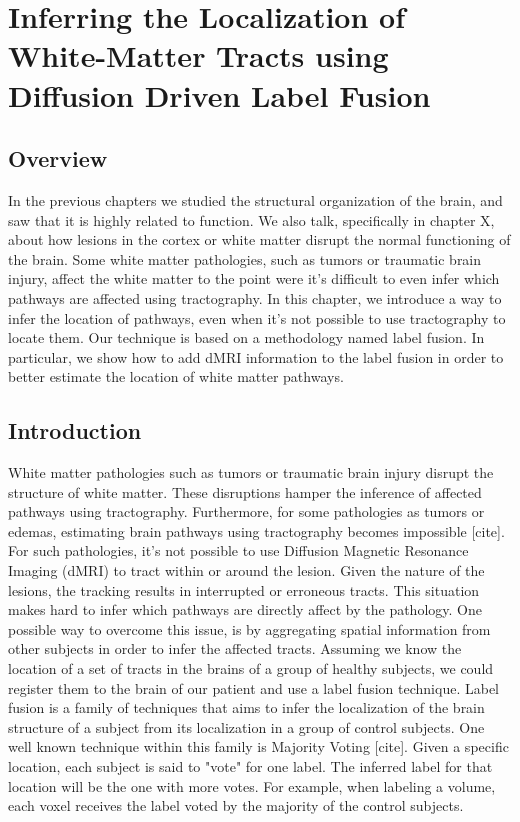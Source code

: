 \chapter{Inferring the Localization of White-Matter Tracts using Diffusion Driven Label Fusion}

\section{Overview}
In the previous chapters we studied the structural organization of the brain,
and saw that it is highly related to function. We also talk, specifically in
chapter X, about how lesions in the cortex or white matter disrupt the normal
functioning of the brain. Some white matter pathologies, such as tumors
or traumatic brain injury, affect the white matter to the point were it's
difficult to even infer which pathways are affected using tractography.
In this chapter, we introduce a way to infer the location of pathways, even
when it's not possible to use tractography to locate them. Our technique is
based on a methodology named label fusion. In particular, we show how to add
dMRI information to the label fusion in order to better estimate the location
of white matter pathways.

\section{Introduction}

White matter pathologies such as tumors or traumatic brain injury disrupt the
structure of white matter. These disruptions hamper the inference of affected
pathways using tractography. Furthermore, for some pathologies as tumors or
edemas, estimating brain pathways using tractography becomes impossible [cite].
For such pathologies, it's not possible to use Diffusion Magnetic Resonance
Imaging (dMRI) to tract within or around the lesion. Given the nature of the
lesions, the tracking results in interrupted or erroneous tracts. This situation
makes hard to infer which pathways are directly affect by the pathology. One
possible way to overcome this issue, is by aggregating spatial information
from other subjects in order to infer the affected tracts. Assuming we know the
location of a set of tracts in the brains of a group of healthy subjects, we
could register them to the brain of our patient and use a label fusion technique.
Label fusion is a family of techniques that aims to infer the localization of the
 brain structure of a subject from its localization in a group of control subjects.
One well known technique within this family is Majority Voting [cite]. Given a
specific location, each subject is said to "vote" for one label. The inferred
label for that location will be the one with more votes. For example, when
labeling a volume, each voxel receives the label voted by the majority of the
control subjects.

